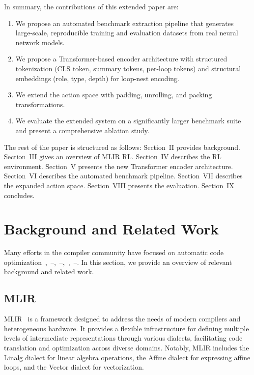 \documentclass[10pt,twocolumn]{article}
\begin{document}
In summary, the contributions of this extended paper are:
\begin{enumerate}
\item We propose an automated benchmark extraction pipeline that generates large-scale, reproducible training and evaluation datasets from real neural network models.
\item We propose a Transformer-based encoder architecture with structured tokenization (CLS token, summary tokens, per-loop tokens) and structural embeddings (role, type, depth) for loop-nest encoding.
\item We extend the action space with padding, unrolling, and packing transformations.
\item We evaluate the extended system on a significantly larger benchmark suite and present a comprehensive ablation study.
\end{enumerate}

The rest of the paper is structured as follows: Section~II provides background. Section~III gives an overview of MLIR RL. Section~IV describes the RL environment. Section~V presents the new Transformer encoder architecture. Section~VI describes the automated benchmark pipeline. Section~VII describes the expanded action space. Section~VIII presents the evaluation. Section~IX concludes.

\section{Background and Related Work}

Many efforts in the compiler community have focused on automatic code optimization~\cite{ref1},~\cite{ref3}--\cite{ref5},~\cite{ref9}--\cite{ref11},~\cite{ref13},~\cite{ref17}--\cite{ref45}. In this section, we provide an overview of relevant background and related work.

\subsection{MLIR}

MLIR~\cite{ref12} is a framework designed to address the needs of modern compilers and heterogeneous hardware. It provides a flexible infrastructure for defining multiple levels of intermediate representations through various dialects, facilitating code translation and optimization across diverse domains. Notably, MLIR includes the Linalg dialect for linear algebra operations, the Affine dialect for expressing affine loops, and the Vector dialect for vectorization.
\end{document}
